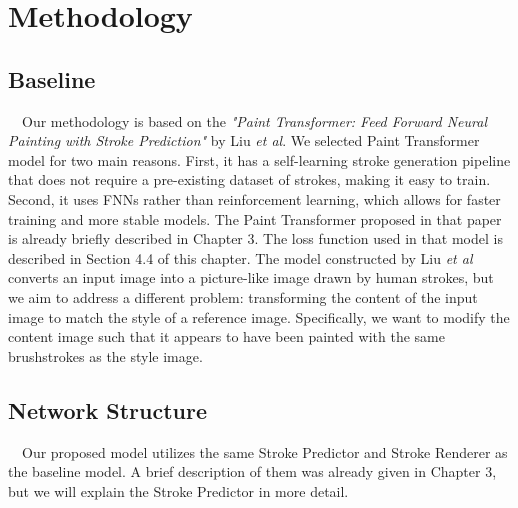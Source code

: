 \chapter{Methodology}

\section{Baseline}
　Our methodology is based on the \textit{"Paint Transformer: Feed Forward Neural Painting with Stroke Prediction"}
by Liu \textit{et al}. We selected Paint Transformer model for two main reasons. 
First, it has a self-learning stroke generation pipeline that does not require 
a pre-existing dataset of strokes, making it easy to train. Second, it uses 
FNNs rather than reinforcement learning, which allows for faster training and 
more stable models.
The Paint Transformer proposed in that paper is already briefly described in 
Chapter 3. The loss function used in that model is described in Section 4.4 
of this chapter. 
The model constructed by Liu \textit{et al} converts an input image into a 
picture-like image drawn by human strokes, but  we aim to address a different 
problem: transforming the content of the input image to match the style of a 
reference image. Specifically, we want to modify the content image such that 
it appears to have been painted with the same brushstrokes as the style image. 

\section{Network Structure}
　Our proposed model utilizes the same Stroke Predictor and Stroke Renderer 
as the baseline model.
A brief description of them was already given in Chapter 3, but we will explain
the Stroke Predictor in more detail.

